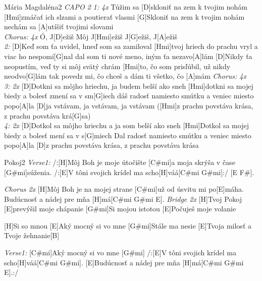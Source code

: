 \documentclass[12pt]{article}
\begin{document}
\begin{song}{Mária Magdaléna}{2}
	\textit{\color{gray} CAPO 2}
	\textit{\color{gray} 1: 4x}
	Túžim sa [D]skloniť na zem k tvojim nohám
	[Hmi]zmáčať ich slzami a poutierať vlasmi
	[G]Skloniť na zem k tvojim nohám
	nechám sa [A]utíšiť tvojimi slovami
	\\
	\textit{\color{gray} Chorus: 4x}
	Ó, J[D]ežiš
	Môj J[Hmi]ežiš
	J[G]ežiš, J[A]ežiš
	\\
	\textit{\color{gray} 2:}
	[D]Keď som ťa uvidel, hneď som sa zamiloval
	[Hmi]tvoj hriech do prachu vryl a viac ho nespomí[G]nal
	dal som ti nové meno, iným ťa nezavo[A]lám
	[D]Nikdy ťa neopustím, veď ty si môj svätý chrám
	[Hmi]to, čo som prisľúbil, už nikdy neodvo[G]lám
	tak povedz mi, čo chceš a dám ti všetko, čo [A]mám
	\columnbreak
	\textit{\color{gray} Chorus: 4x}
	\\
	\textit{\color{gray} 3: 2x}
	[D]Dotkni sa môjho hriechu, ja budem belší ako sneh
	[Hmi]dotkni sa mojej biedy a bolesť zmení sa v sm[G]iech
	dáš radosť namiesto smútku a veniec miesto popo[A]la
	[D]ja vstávam, ja vstávam, ja vstávam
	([Hmi]z prachu povstáva krása, z prachu povstáva krá[G]sa)
	\\
	\textit{\color{gray} 4: 2x}
	[D]Dotkol sa môjho hriechu a ja som belší ako sneh
	[Hmi]Dotkol sa mojej biedy a bolesť mení sa v s[G]miech
	Dal radosť namiesto smútku a veniec miesto popo[A]la
	[D]z prachu povstáva krása, z prachu povstáva krása
\end{song}

\begin{song}{Pokoj}{2}
\textit{\color{gray}Verse1:}
/:[H]Môj Boh je moje útočište
[C#mi]a moja skrýša v čase [G#mi]súženia.
/:[E]V tôni svojich krídel ma scho[H]váá[C#mi G#mi]:/
[E F#].

\textit{\color{gray}Chorus 2x}
[H]Môj Boh je na mojej strane
[C#mi]už od úsvitu mi po[E]máha.
Budúcnosť a nádej pre mňa [H]má[C#mi G#mi E].
\columnbreak
\textit{\color{gray}Bridge 2x}
[H]Tvoj Pokoj [E]prevýšil moje chápanie
[G#mi]Si mojou istotou [E]Počuješ moje volanie 

[H]Si so mnou [E]Aký mocný si vo mne
[G#mi]Stále ma nesie [E]Tvoja milosť a Tvoje žehnanie[B]

\textit{\color{gray}Verse1:}
[C#mi]Aký mocný si vo mne [G#mi]
/:[E]V tôni svojich krídel ma scho[H]váá[C#mi G#mi].
[E]Budúcnosť a nádej pre mňa [H]má[C#mi G#mi E].:/
\end{song}
\end{document}
